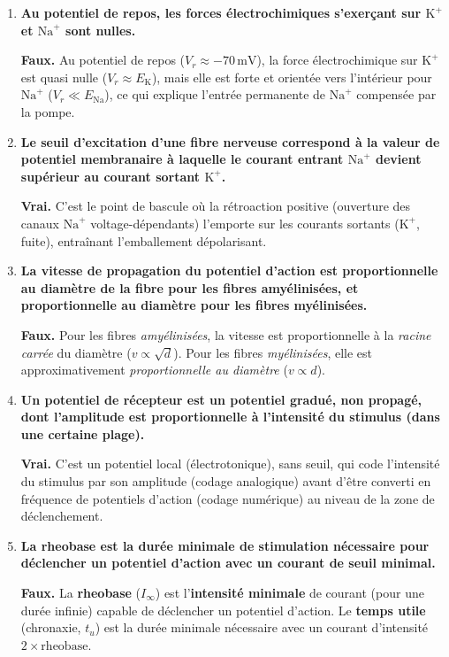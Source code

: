 \documentclass[11pt]{article}
\begin{document}
\begin{exercice}
\begin{enumerate}
\item \textbf{Au potentiel de repos, les forces électrochimiques s'exerçant sur $\text{K}^+$ et $\text{Na}^+$ sont nulles.}
\par \textbf{Faux.} Au potentiel de repos ($V_r \approx -70\,\text{mV}$), la force électrochimique sur $\text{K}^+$ est quasi nulle ($V_r \approx E_{\text{K}}$), mais elle est forte et orientée vers l'intérieur pour $\text{Na}^+$ ($V_r \ll E_{\text{Na}}$), ce qui explique l'entrée permanente de $\text{Na}^+$ compensée par la pompe.
\item \textbf{Le seuil d'excitation d'une fibre nerveuse correspond à la valeur de potentiel membranaire à laquelle le courant entrant $\text{Na}^+$ devient supérieur au courant sortant $\text{K}^+$.}
\par \textbf{Vrai.} C'est le point de bascule où la rétroaction positive (ouverture des canaux $\text{Na}^+$ voltage-dépendants) l'emporte sur les courants sortants ($\text{K}^+$, fuite), entraînant l'emballement dépolarisant.
\item \textbf{La vitesse de propagation du potentiel d'action est proportionnelle au diamètre de la fibre pour les fibres amyélinisées, et proportionnelle au diamètre pour les fibres myélinisées.}
\par \textbf{Faux.} Pour les fibres \emph{amyélinisées}, la vitesse est proportionnelle à la \emph{racine carrée} du diamètre ($v \propto \sqrt{d}$). Pour les fibres \emph{myélinisées}, elle est approximativement \emph{proportionnelle au diamètre} ($v \propto d$).
\item \textbf{Un potentiel de récepteur est un potentiel gradué, non propagé, dont l'amplitude est proportionnelle à l'intensité du stimulus (dans une certaine plage).}
\par \textbf{Vrai.} C'est un potentiel local (électrotonique), sans seuil, qui code l'intensité du stimulus par son amplitude (codage analogique) avant d'être converti en fréquence de potentiels d'action (codage numérique) au niveau de la zone de déclenchement.
\item \textbf{La rheobase est la durée minimale de stimulation nécessaire pour déclencher un potentiel d'action avec un courant de seuil minimal.}
\par \textbf{Faux.} La \textbf{rheobase} ($I_{\infty}$) est l'\textbf{intensité minimale} de courant (pour une durée infinie) capable de déclencher un potentiel d'action. Le \textbf{temps utile} (chronaxie, $t_u$) est la durée minimale nécessaire avec un courant d'intensité $2 \times \text{rheobase}$.
\end{enumerate}
\end{exercice}
\end{document}
